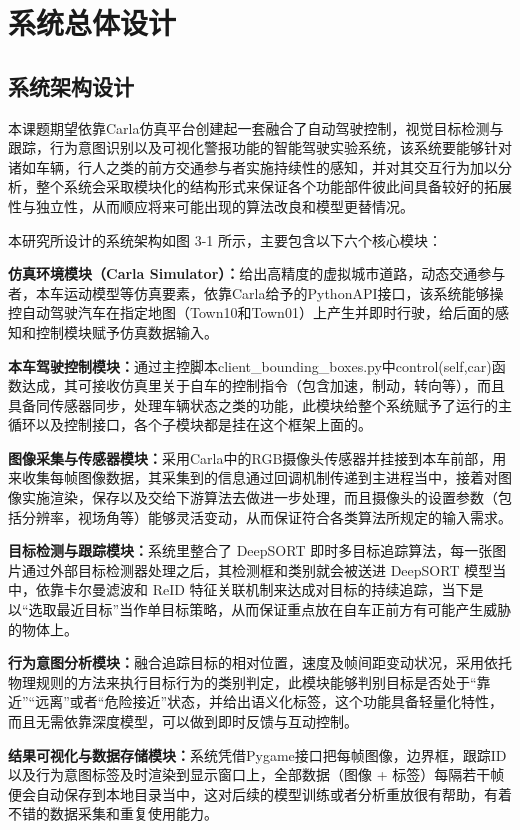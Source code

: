 \chapter{系统总体设计}

\section{系统架构设计}

本课题期望依靠Carla仿真平台创建起一套融合了自动驾驶控制，视觉目标检测与跟踪，行为意图识别以及可视化警报功能的智能驾驶实验系统，该系统要能够针对诸如车辆，行人之类的前方交通参与者实施持续性的感知，并对其交互行为加以分析，整个系统会采取模块化的结构形式来保证各个功能部件彼此间具备较好的拓展性与独立性，从而顺应将来可能出现的算法改良和模型更替情况。

本研究所设计的系统架构如图 3-1 所示，主要包含以下六个核心模块：

\textbf{仿真环境模块（Carla Simulator）：}给出高精度的虚拟城市道路，动态交通参与者，本车运动模型等仿真要素，依靠Carla给予的PythonAPI接口，该系统能够操控自动驾驶汽车在指定地图（Town10和Town01）上产生并即时行驶，给后面的感知和控制模块赋予仿真数据输入。

\textbf{本车驾驶控制模块：}通过主控脚本client\_bounding\_boxes.py中control(self,car)函数达成，其可接收仿真里关于自车的控制指令（包含加速，制动，转向等），而且具备同传感器同步，处理车辆状态之类的功能，此模块给整个系统赋予了运行的主循环以及控制接口，各个子模块都是挂在这个框架上面的。

\textbf{图像采集与传感器模块：}采用Carla中的RGB摄像头传感器并挂接到本车前部，用来收集每帧图像数据，其采集到的信息通过回调机制传递到主进程当中，接着对图像实施渲染，保存以及交给下游算法去做进一步处理，而且摄像头的设置参数（包括分辨率，视场角等）能够灵活变动，从而保证符合各类算法所规定的输入需求。

\textbf{目标检测与跟踪模块：}系统里整合了 DeepSORT 即时多目标追踪算法，每一张图片通过外部目标检测器处理之后，其检测框和类别就会被送进 DeepSORT 模型当中，依靠卡尔曼滤波和 ReID 特征关联机制来达成对目标的持续追踪，当下是以“选取最近目标”当作单目标策略，从而保证重点放在自车正前方有可能产生威胁的物体上。

\textbf{行为意图分析模块：}融合追踪目标的相对位置，速度及帧间距变动状况，采用依托物理规则的方法来执行目标行为的类别判定，此模块能够判别目标是否处于“靠近”“远离”或者“危险接近”状态，并给出语义化标签，这个功能具备轻量化特性，而且无需依靠深度模型，可以做到即时反馈与互动控制。

\textbf{结果可视化与数据存储模块：}系统凭借Pygame接口把每帧图像，边界框，跟踪ID以及行为意图标签及时渲染到显示窗口上，全部数据（图像 + 标签）每隔若干帧便会自动保存到本地目录当中，这对后续的模型训练或者分析重放很有帮助，有着不错的数据采集和重复使用能力。

